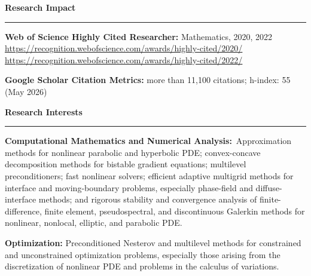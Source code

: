 \documentclass[10pt,letterpaper]{article}
\newcommand{\cvsection}[1]{%
  \Needspace{5\baselineskip}\par\vspace{13pt}%
  {\color{Smokey}\fontsize{15}{17}\selectfont\bfseries #1}\par\vspace{3pt}%
  {\color{UTOrange}\rule{\linewidth}{1.8pt}}\par\vspace{4pt}%
}
\begin{document}
	\smallskip
	
\cvsection{Research Impact}
    \begin{description}
    \item
\textbf{Web of Science Highly Cited Researcher:} Mathematics, 2020, 2022
	\\
\url{https://recognition.webofscience.com/awards/highly-cited/2020/}
	\\
\url{https://recognition.webofscience.com/awards/highly-cited/2022/}
   	\item
\textbf{Google Scholar Citation Metrics:} more than 11,100 citations; h-index: 55 (May 2026)
    \end{description}
    
    \smallskip
	
\cvsection{Research Interests}
    \begin{description}
    \item
\textbf{Computational Mathematics and Numerical Analysis:}~Approximation methods for nonlinear parabolic and hyperbolic PDE; convex-concave decomposition methods for bistable gradient equations; multilevel preconditioners; fast nonlinear solvers; efficient adaptive multigrid methods for interface and moving-boundary problems, especially phase-field and diffuse-interface methods; and rigorous stability and convergence analysis of finite-difference, finite element, pseudospectral, and discontinuous Galerkin methods for nonlinear, nonlocal, elliptic, and parabolic PDE.
	\item
\textbf{Optimization:} Preconditioned Nesterov and multilevel methods for constrained and unconstrained optimization problems, especially those arising from the discretization of nonlinear PDE and problems in the calculus of variations.


\end{description}
\end{document}
